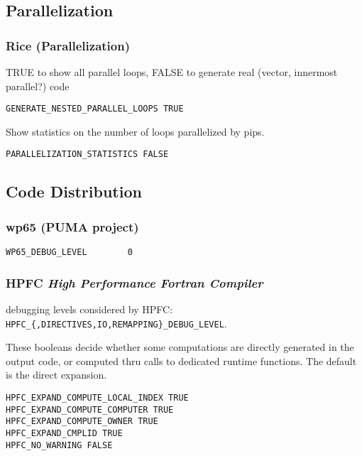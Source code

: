 \subsection{Parallelization}

\subsubsection{Rice (Parallelization)}

TRUE to show all parallel loops, FALSE to generate real (vector,
innermost parallel?) code

\begin{verbatim}
GENERATE_NESTED_PARALLEL_LOOPS TRUE
\end{verbatim}

Show statistics on the number of loops parallelized by pips.
\begin{verbatim}
PARALLELIZATION_STATISTICS FALSE
\end{verbatim}

\subsection{Code Distribution}

\subsubsection{wp65 (PUMA project)}

\begin{verbatim}
WP65_DEBUG_LEVEL        0
\end{verbatim}

\subsubsection{HPFC {\em High Performance Fortran Compiler}}

debugging levels considered by HPFC: 
\verb+HPFC_{,DIRECTIVES,IO,REMAPPING}_DEBUG_LEVEL+.

  These booleans decide whether some computations are directly
generated in the output code, or computed thru calls to dedicated
runtime functions. The default is the direct expansion.

\begin{verbatim}
HPFC_EXPAND_COMPUTE_LOCAL_INDEX TRUE
HPFC_EXPAND_COMPUTE_COMPUTER TRUE
HPFC_EXPAND_COMPUTE_OWNER TRUE
HPFC_EXPAND_CMPLID TRUE
HPFC_NO_WARNING FALSE
\end{verbatim}

